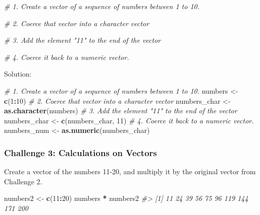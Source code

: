 \documentclass[]{book}
\newenvironment{Shaded}{\begin{snugshade}}{\end{snugshade}}
\newcommand{\KeywordTok}[1]{\textcolor[rgb]{0.13,0.29,0.53}{\textbf{#1}}}
\newcommand{\DecValTok}[1]{\textcolor[rgb]{0.00,0.00,0.81}{#1}}
\newcommand{\StringTok}[1]{\textcolor[rgb]{0.31,0.60,0.02}{#1}}
\newcommand{\CommentTok}[1]{\textcolor[rgb]{0.56,0.35,0.01}{\textit{#1}}}
\newcommand{\OperatorTok}[1]{\textcolor[rgb]{0.81,0.36,0.00}{\textbf{#1}}}
\newcommand{\NormalTok}[1]{#1}
\begin{document}
\begin{Shaded}
\begin{Highlighting}[]

\CommentTok{# 1. Create a vector of a sequence of numbers between 1 to 10.}

\CommentTok{# 2. Coerce that vector into a character vector}

\CommentTok{# 3. Add the element "11" to the end of the vector}

\CommentTok{# 4. Coerce it back to a numeric vector.}
\end{Highlighting}
\end{Shaded}

Solution:

\begin{Shaded}
\begin{Highlighting}[]
\CommentTok{# 1. Create a vector of a sequence of numbers between 1 to 10.}
\NormalTok{numbers <-}\StringTok{ }\KeywordTok{c}\NormalTok{(}\DecValTok{1}\OperatorTok{:}\DecValTok{10}\NormalTok{)}
\CommentTok{# 2. Coerce that vector into a character vector}
\NormalTok{numbers_char <-}\StringTok{ }\KeywordTok{as.character}\NormalTok{(numbers)}
\CommentTok{# 3. Add the element "11" to the end of the vector}
\NormalTok{numbers_char <-}\StringTok{ }\KeywordTok{c}\NormalTok{(numbers_char, }\DecValTok{11}\NormalTok{)}
\CommentTok{# 4. Coerce it back to a numeric vector.}
\NormalTok{numbers_num <-}\StringTok{ }\KeywordTok{as.numeric}\NormalTok{(numbers_char)}
\end{Highlighting}
\end{Shaded}

\subsubsection*{Challenge 3: Calculations on
Vectors}\label{challenge-3-calculations-on-vectors}

Create a vector of the numbers 11-20, and multiply it by the original
vector from Challenge 2.

\begin{Shaded}
\begin{Highlighting}[]
\NormalTok{numbers2 <-}\StringTok{ }\KeywordTok{c}\NormalTok{(}\DecValTok{11}\OperatorTok{:}\DecValTok{20}\NormalTok{)}
\NormalTok{numbers }\OperatorTok{*}\StringTok{ }\NormalTok{numbers2}
\CommentTok{#>  [1]  11  24  39  56  75  96 119 144 171 200}
\end{Highlighting}
\end{Shaded}
\end{document}
